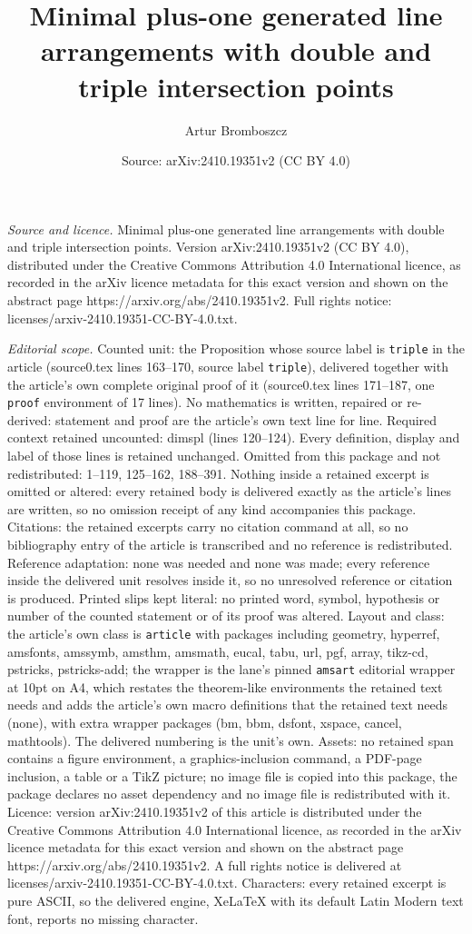 \documentclass[10pt,a4paper]{amsart}
\title[Minimal plus-one generated line arrangements with double and]{Minimal plus-one generated line arrangements with double and triple intersection points}
\author{Artur Bromboszcz}
\date{Source: arXiv:2410.19351v2 (CC BY 4.0)}
\begin{document}
\maketitle

\noindent\emph{Source and licence.} Minimal plus-one generated line arrangements with double and triple intersection points. Version arXiv:2410.19351v2 (CC BY 4.0), distributed under the Creative Commons Attribution 4.0 International licence, as recorded in the arXiv licence metadata for this exact version and shown on the abstract page https://arxiv.org/abs/2410.19351v2. Full rights notice: licenses/arxiv-2410.19351-CC-BY-4.0.txt.\par\smallskip

\noindent\textit{Editorial scope.} Counted unit: the Proposition whose source label is \texttt{triple} in the article (source0.tex lines 163--170, source label \texttt{triple}), delivered together with the article's own complete original proof of it (source0.tex lines 171--187, one \texttt{proof} environment of 17 lines). No mathematics is written, repaired or re-derived: statement and proof are the article's own text line for line. Required context retained uncounted: dimspl (lines 120--124). Every definition, display and label of those lines is retained unchanged. Omitted from this package and not redistributed: 1--119, 125--162, 188--391. Nothing inside a retained excerpt is omitted or altered: every retained body is delivered exactly as the article's lines are written, so no omission receipt of any kind accompanies this package. Citations: the retained excerpts carry no citation command at all, so no bibliography entry of the article is transcribed and no reference is redistributed. Reference adaptation: none was needed and none was made; every reference inside the delivered unit resolves inside it, so no unresolved reference or citation is produced. Printed slips kept literal: no printed word, symbol, hypothesis or number of the counted statement or of its proof was altered. Layout and class: the article's own class is \texttt{article} with packages including geometry, hyperref, amsfonts, amssymb, amsthm, amsmath, eucal, tabu, url, pgf, array, tikz-cd, pstricks, pstricks-add; the wrapper is the lane's pinned \texttt{amsart} editorial wrapper at 10pt on A4, which restates the theorem-like environments the retained text needs and adds the article's own macro definitions that the retained text needs (none), with extra wrapper packages (bm, bbm, dsfont, xspace, cancel, mathtools). The delivered numbering is the unit's own. Assets: no retained span contains a figure environment, a graphics-inclusion command, a PDF-page inclusion, a table or a TikZ picture; no image file is copied into this package, the package declares no asset dependency and no image file is redistributed with it. Licence: version arXiv:2410.19351v2 of this article is distributed under the Creative Commons Attribution 4.0 International licence, as recorded in the arXiv licence metadata for this exact version and shown on the abstract page https://arxiv.org/abs/2410.19351v2. A full rights notice is delivered at licenses/arxiv-2410.19351-CC-BY-4.0.txt. Characters: every retained excerpt is pure ASCII, so the delivered engine, XeLaTeX with its default Latin Modern text font, reports no missing character.
\end{document}
